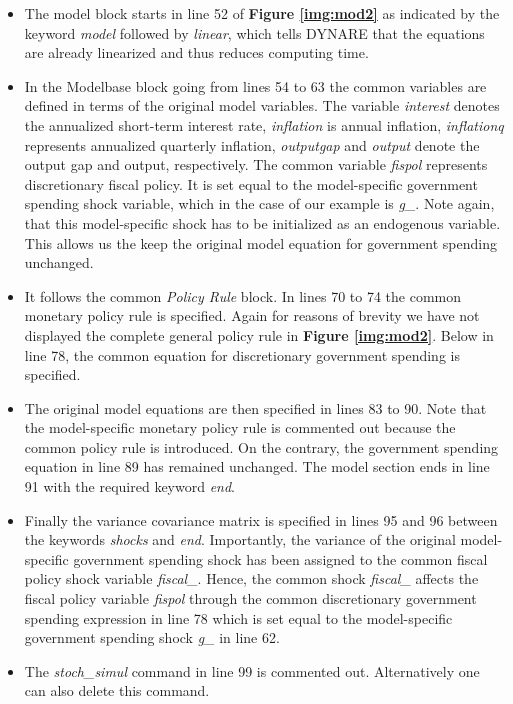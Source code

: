 \begin{itemize}
\item The model block starts in line 52 of {\bf Figure \ref{img:mod2}} as indicated by the keyword \textit{model} followed
by \textit{linear}, which tells DYNARE that the equations are already linearized and thus reduces computing time.
\item In the Modelbase block going from lines 54 to 63 the common variables are defined in terms of the original model variables.
The variable \textit{interest} denotes the annualized short-term interest rate, \textit{inflation} is annual inflation,
\textit{inflationq} represents annualized quarterly inflation, \textit{outputgap} and \textit{output} denote the output gap and output, respectively.
The common variable \textit{fispol} represents discretionary fiscal policy. It is set equal to the model-specific government spending
shock variable, which in the case of our example is \textit{g\_}. Note again, that this model-specific shock has to be initialized
as an endogenous variable. This allows us the keep the original model equation for government spending unchanged.
\item It follows the common \textit{Policy Rule} block. In lines 70 to 74 the common monetary policy rule is specified.
Again for reasons of brevity we have not displayed the complete general policy rule in {\bf Figure \ref{img:mod2}}.
Below in line 78, the common equation for discretionary government spending is specified.
\item The original model equations are then specified in lines 83 to 90. Note that the model-specific monetary policy rule is commented out because the common policy rule is introduced. On the contrary, the government spending equation in line 89 has remained unchanged.
The model section ends in line 91 with the required keyword \textit{end}.
\item Finally the variance covariance matrix is specified in lines 95 and 96 between the keywords \textit{shocks} and \textit{end}. Importantly, the variance of the original model-specific government spending shock has been assigned to the common fiscal policy shock variable \textit{fiscal\_}. Hence, the common shock \textit{fiscal\_} affects the fiscal policy variable \textit{fispol} through the common discretionary government spending expression in line 78 which is set equal to the model-specific government spending shock \textit{g\_} in line 62.
\item The \textit{stoch\_simul} command in line 99 is commented out. Alternatively one can also delete this command.
\end{itemize}

